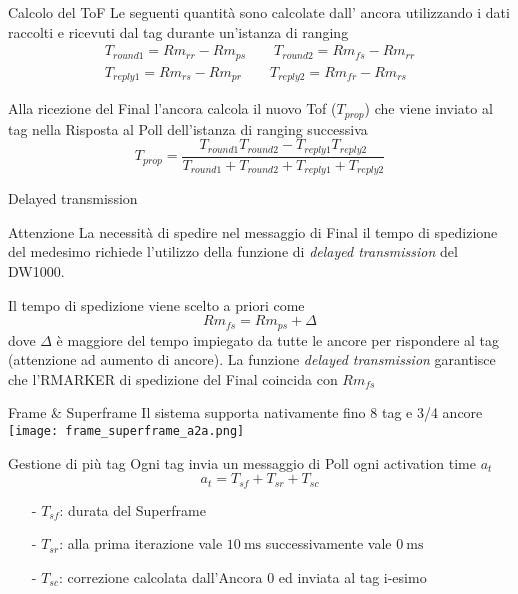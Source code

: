 \begin{frame}{Calcolo del ToF}
  Le seguenti quantità sono \alert{calcolate} dall' \alert{ancora} utilizzando i dati raccolti e
  ricevuti dal tag durante un'istanza di ranging
  \[
  \begin{split}
    T_{round1} = Rm_{rr} - Rm_{ps} \quad \quad T_{round2} = Rm_{fs} - Rm_{rr}\\
    T_{reply1} = Rm_{rs} - Rm_{pr} \quad \quad T_{reply2} = Rm_{fr} - Rm_{rs}
  \end{split}
  \]

  Alla ricezione del Final l'ancora calcola il nuovo Tof ($T_{prop}$) che viene inviato al tag nella Risposta al Poll dell'istanza di ranging \alert{successiva}
  \[
  T_{prop} = \frac{T_{round1} T_{round2} - T_{reply1} T_{reply2}}{T_{round1} + T_{round2} + T_{reply1} + T_{reply2}}
  \]
\end{frame}

\begin{frame}{Delayed transmission}
  \begin{alertblock}{Attenzione}
    La necessità di spedire nel messaggio di Final il tempo di spedizione del medesimo richiede
    l'utilizzo della funzione di \emph{delayed transmission} del DW1000.
  \end{alertblock}
  Il tempo di spedizione viene scelto a priori come
  \[
  Rm_{fs} = Rm_{ps} + \Delta
  \]
  dove $\Delta$ è maggiore del tempo impiegato da tutte le ancore per rispondere al tag (attenzione ad aumento di ancore).
  La funzione \emph{delayed transmission} garantisce che l'RMARKER di spedizione del Final coincida con
  $Rm_{fs}$
\end{frame}

\begin{frame}{Frame \& Superframe}
  Il sistema supporta \alert{nativamente} fino 8 tag e 3/4 ancore
  \centering
  \texttt{[image: frame\_superframe\_a2a.png]}
\end{frame}

\begin{frame}{Gestione di più tag}
  Ogni tag invia un messaggio di Poll ogni \alert{activation time} $a_t$
  \[
  a_t = T_{sf} + T_{sr} + T_{sc}
  \]
  \begin{itemize}
  \item[-] $T_{sf}$: durata del Superframe 
  \item[-] $T_{sr}$: alla prima iterazione vale $\SI{10}{\milli\second}$ successivamente vale  $\SI{0}{\milli\second}$
  \item[-] $T_{sc}$: correzione calcolata dall'\alert{Ancora 0} ed inviata al \alert{tag i-esimo} 
  \end{itemize}
\end{frame}

